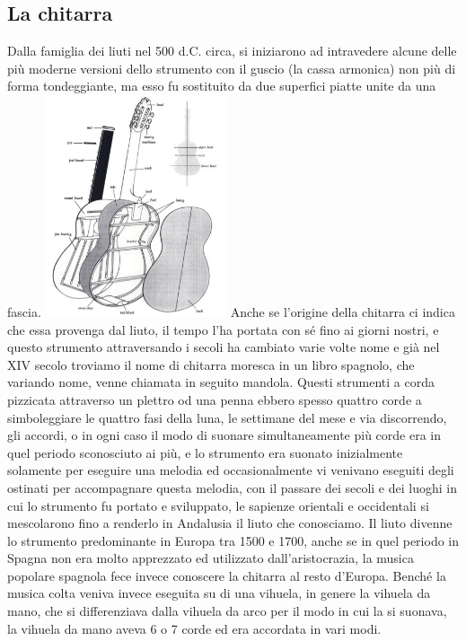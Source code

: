 \documentclass[oneside]{article}
\begin{document}
\begin{multicols*}{2}

\section{La chitarra}

Dalla famiglia dei liuti nel 500 d.C. circa, si iniziarono ad intravedere alcune delle più moderne versioni dello strumento con il guscio (la cassa armonica) non più di forma tondeggiante, ma esso fu sostituito da due superfici piatte unite da una fascia.
\includegraphics[width=0.4\textwidth]{img/chit_spaccato.png}
Anche se l’origine della chitarra ci indica che essa provenga dal liuto, il tempo l’ha portata con sé fino ai giorni nostri, e questo strumento attraversando i secoli ha cambiato varie volte nome e già nel XIV secolo troviamo il nome di chitarra moresca in un libro spagnolo, che variando nome, venne chiamata in seguito mandola.
Questi strumenti a corda pizzicata attraverso un plettro od una penna ebbero spesso quattro corde a simboleggiare le quattro fasi della luna, le settimane del mese e via discorrendo, gli accordi, o in ogni caso il modo di suonare simultaneamente più corde era in quel periodo sconosciuto ai più, e lo strumento era suonato inizialmente solamente per eseguire una melodia ed occasionalmente vi venivano eseguiti degli ostinati per accompagnare questa melodia, con il passare dei secoli e dei luoghi in cui lo strumento fu portato e sviluppato, le sapienze orientali e occidentali si mescolarono fino a renderlo in Andalusia il liuto che conosciamo.
Il liuto divenne lo strumento predominante in Europa tra 1500 e 1700, anche se in quel periodo in Spagna non era molto apprezzato ed utilizzato dall’aristocrazia, la musica popolare spagnola fece invece conoscere la chitarra al resto d’Europa. Benché la musica colta veniva invece eseguita su di una vihuela, in genere la vihuela da mano, che si differenziava dalla vihuela da arco per il modo in cui la si suonava, la vihuela da mano aveva 6 o 7 corde ed era accordata in vari modi.

\end{multicols*}
\end{document}
